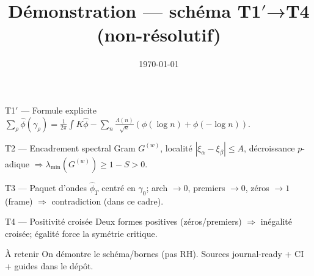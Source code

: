 \documentclass[aspectratio=169]{beamer}
\title{\texorpdfstring{Démonstration — schéma T1$′$→T4 (non-résolutif)}{Démonstration — schéma T1′→T4 (non-résolutif)}}
\author{\InterIAPDFAuthors}
\date{\today}
\begin{document}


\begin{frame}\titlepage\end{frame}
\begin{frame}{T1$′$ — Formule explicite}
\small $\displaystyle \sum_\rho \widehat\phi(\gamma_\rho)=\frac{1}{2\pi}\int K\widehat\phi-\sum_n \frac{\Lambda(n)}{\sqrt n}(\phi(\log n)+\phi(-\log n))$.
\end{frame}
\begin{frame}{T2 — Encadrement spectral}
\small Gram $G^{(w)}$, localité $|\xi_\alpha-\xi_\beta|\le A$, décroissance $p$-adique $\Rightarrow \lambda_{\min}(G^{(w)})\ge 1-S>0$.
\end{frame}
\begin{frame}{T3 — Paquet d’ondes}
\small $\widehat\phi_T$ centré en $\gamma_0$; arch $\to 0$, premiers $\to 0$, zéros $\to 1$ (frame) $\Rightarrow$ contradiction (dans ce cadre).
\end{frame}
\begin{frame}{T4 — Positivité croisée}
\small Deux formes positives (zéros/premiers) $\Rightarrow$ inégalité croisée; égalité force la symétrie critique.
\end{frame}
\begin{frame}{À retenir}
\small On démontre le schéma/bornes (pas RH). Sources journal-ready + CI + guides dans le dépôt.
\end{frame}
\end{document}
